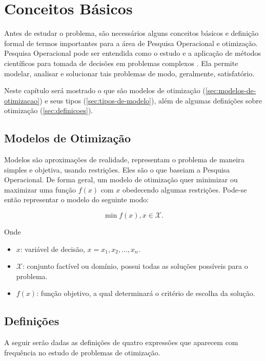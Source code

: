 \chapter{Conceitos Básicos}\label{ch:conceitos-basicos}

Antes de estudar o problema, são necessários alguns conceitos básicos e definição formal de termos importantes para a área de Pesquisa Operacional e otimização.
Pesquisa Operacional pode ser entendida como o estudo e a aplicação de métodos científicos para tomada de decisões em problemas complexos \cite[p.IX]{arenales}.
Ela permite modelar, analisar e solucionar tais problemas de modo, geralmente, satisfatório.

Neste capítulo será mostrado o que são modelos de otimização (\autoref{sec:modelos-de-otimizacao}) e seus tipos (\autoref{sec:tipos-de-modelo}), além de algumas definições sobre otimização (\autoref{sec:definicoes}).


\section{Modelos de Otimização}\label{sec:modelos-de-otimizacao}

Modelos são aproximações de realidade, representam o problema de maneira simples e objetiva, usando restrições.
Eles são o que baseiam a Pesquisa Operacional.
De forma geral, um modelo de otimização quer minimizar ou maximizar uma função $f(x)$ com $x$ obedecendo algumas restrições.
Pode-se então representar o modelo do seguinte modo:

\[
    \min f(x), x \in \mathcal{X}.
\]

Onde

\begin{itemize}
    \item $x$: variável de decisão, $x = x_1, x_2, \dots, x_n$.
    \item $\mathcal{X}$: conjunto factível ou domínio, possui todas as soluções possíveis para o problema.
    \item $f(x)$: função objetivo, a qual determinará o critério de escolha da solução.
\end{itemize}


\section{Definições}\label{sec:definicoes}

A seguir serão dadas as definições de quatro expressões que aparecem com frequência no estudo de problemas de otimização.

